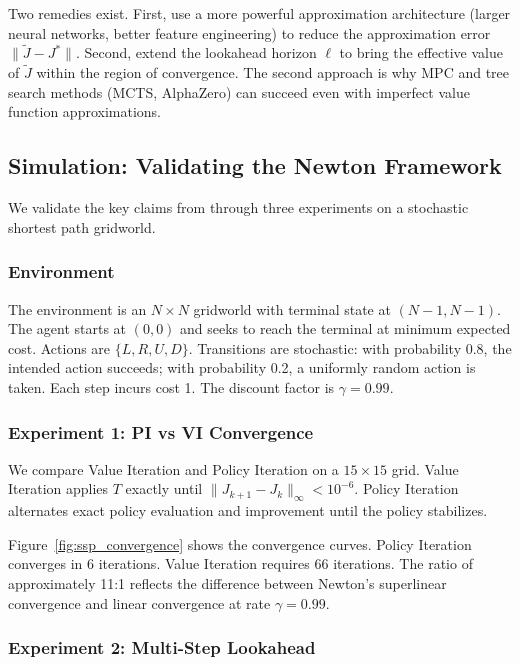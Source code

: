 Two remedies exist. First, use a more powerful approximation architecture (larger neural networks, better feature engineering) to reduce the approximation error $\|\tilde{J} - J^*\|$. Second, extend the lookahead horizon $\ell$ to bring the effective value of $\tilde{J}$ within the region of convergence. The second approach is why MPC and tree search methods (MCTS, AlphaZero) can succeed even with imperfect value function approximations.


\subsection{Simulation: Validating the Newton Framework}
\label{sec:simulation}

We validate the key claims from \citet{bertsekas2024} through three experiments on a stochastic shortest path gridworld.

\subsubsection{Environment}

The environment is an $N \times N$ gridworld with terminal state at $(N-1, N-1)$. The agent starts at $(0,0)$ and seeks to reach the terminal at minimum expected cost. Actions are $\{L, R, U, D\}$. Transitions are stochastic: with probability 0.8, the intended action succeeds; with probability 0.2, a uniformly random action is taken. Each step incurs cost 1. The discount factor is $\gamma = 0.99$.

\subsubsection{Experiment 1: PI vs VI Convergence}

We compare Value Iteration and Policy Iteration on a $15 \times 15$ grid. Value Iteration applies $T$ exactly until $\|J_{k+1} - J_k\|_\infty < 10^{-6}$. Policy Iteration alternates exact policy evaluation and improvement until the policy stabilizes.

Figure~\ref{fig:ssp_convergence} shows the convergence curves. Policy Iteration converges in 6 iterations. Value Iteration requires 66 iterations. The ratio of approximately 11:1 reflects the difference between Newton's superlinear convergence and linear convergence at rate $\gamma = 0.99$.

\subsubsection{Experiment 2: Multi-Step Lookahead}

